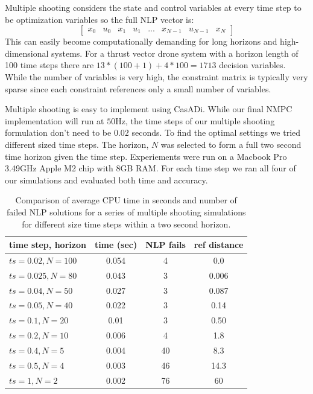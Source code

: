 \documentclass[]{article}
\newcommand{\casadi}{CasADi}
\begin{document}
	Multiple shooting considers the state and control variables at every time step to be optimization variables so the full NLP vector is:
        \[
        \begin{bmatrix}
        x_0 & u_0 & x_1 & u_1 & ... & x_{N-1} & u_{N-1} & x_N
        \end{bmatrix}
        \]
	This can easily become computationally demanding for long horizons and high-dimensional systems. For a thrust vector drone system with a  horizon length of 100 time steps there are $13 * (100+1)+4*100=1713$ decision variables. While the number of variables is very high, the constraint matrix is typically very sparse since each constraint references only a small number of variables. 

	Multiple shooting is easy to implement using {\casadi}.  While our final NMPC implementation will run at $50$Hz, the time steps of our multiple shooting formulation don't need to be $0.02$ seconds. To find the optimal settings we tried different sized time steps. The horizon, $N$ was selected to form a full two second time horizon given the time step. Experiements were run on a Macbook Pro  3.49GHz Apple M2 chip with 8GB RAM. For each time step we ran all four of our simulations and evaluated both time and accuracy.  
	
	
	\begin{table}[h!]	
		\begin{center}
			\begin{tabular}{ | l | c | c | c |} 
				\hline
				time step, horizon & time (sec)  & NLP fails   &  ref distance  \\
				\hline
				$ts=0.02, N=100$ &      0.054 & 4  & 0.0 \\ 
				$ts=0.025, N=80$  &        0.043 & 3    & 0.006   \\ 
				$ts=0.04, N=50$  &      0.027 & 3   & 0.087   \\ 
				$ts=0.05, N=40$ &            0.022  & 3 & 0.14 \\ 
				$ts=0.1, N=20$ &            0.01  & 3 &  0.50 \\ 
				$ts=0.2, N=10$ &            0.006  & 4 &  1.8 \\ 
				$ts=0.4, N=5$ &            0.004  & 40&   8.3 \\ 
				$ts=0.5, N=4$ &            0.003  & 46 &   14.3 \\ 
				$ts=1, N=2$ &            0.002  & 76 &  60 \\ 
				\hline
			\end{tabular}
			\caption{Comparison of average CPU time in seconds and number of failed NLP solutions for a series of  multiple shooting simulations for different size time steps within a two second horizon. }
			\label{table:msCPU}
		\end{center}
	\end{table}
	
\end{document}
